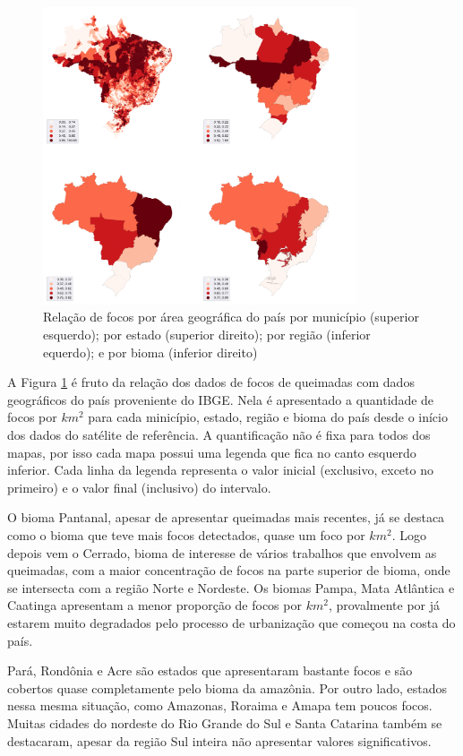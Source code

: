 \documentclass[cic,tc]{iiufrgs}
\begin{document}
\begin{figure}
    \caption{Relação de focos por área geográfica do país por município (superior esquerdo); por estado (superior direito); por região (inferior equerdo); e por bioma (inferior direito)}
    \begin{center}
        \includegraphics[width=25em]{brasil_focos}
    \end{center}
    \label{fig:brasil_focos}
\end{figure}

A Figura \ref{fig:brasil_focos} é fruto da relação dos dados de focos de queimadas com dados geográficos do país proveniente do IBGE. Nela é apresentado a quantidade de focos por $km^2$ para cada minicípio, estado, região e bioma do país desde o início dos dados do satélite de referência. A quantificação não é fixa para todos dos mapas, por isso cada mapa possui uma legenda que fica no canto esquerdo inferior. Cada linha da legenda representa o valor inicial (exclusivo, exceto no primeiro) e o valor final (inclusivo) do intervalo. 

O bioma Pantanal, apesar de apresentar queimadas mais recentes, já se destaca como o bioma que teve mais focos detectados, quase um foco por $km^2$. Logo depois vem o Cerrado, bioma de interesse de vários trabalhos que envolvem as queimadas, com a maior concentração de focos na parte superior de bioma, onde se intersecta com a região Norte e Nordeste. Os biomas Pampa, Mata Atlântica e Caatinga apresentam a menor proporção de focos por $km^2$, provalmente por já estarem muito degradados pelo processo de urbanização que começou na costa do país.

Pará, Rondônia e Acre são estados que apresentaram bastante focos e são cobertos quase completamente pelo bioma da amazônia. Por outro lado, estados nessa mesma situação, como Amazonas, Roraima e Amapa tem poucos focos. Muitas cidades do nordeste do Rio Grande do Sul e Santa Catarina também se destacaram, apesar da região Sul inteira não apresentar valores significativos. 
\end{document}
